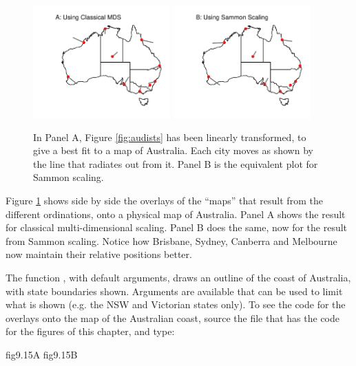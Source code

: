 \begin{figure}[h]
\begin{Schunk}


\centerline{\includegraphics[width=0.47\textwidth]{figs/9-au-both-1} \includegraphics[width=0.47\textwidth]{figs/9-au-both-2} }

\end{Schunk}
      \caption{In Panel A, Figure \ref{fig:audists} has been linearly
        transformed, to give a best fit to a map of Australia.  Each city
        moves as shown by the line that radiates out from it.  Panel B
        is the equivalent plot for Sammon scaling.
\label{fig:aufit}}
 \end{figure}
 Figure \ref{fig:aufit} shows side by side the overlays of the
 ``maps'' that result from the different ordinations, onto a physical
 map of Australia.  Panel A shows the result for classical
 multi-dimensional scaling.  Panel B does the same, now for the
 result from Sammon scaling.  Notice how Brisbane, Sydney, Canberra
 and Melbourne now maintain their relative positions better.

The function , with default arguments, draws an
outline of the coast of Australia, with state boundaries shown.
Arguments are available that can be used to limit what is shown 
(e.g. the NSW and Victorian states only).
To see the code for the overlays onto the map of the Australian
coast, source the file that has the code for the figures of this
chapter, and type:
\begin{Schunk}
\begin{Sinput}
fig9.15A
fig9.15B
\end{Sinput}
\end{Schunk}

